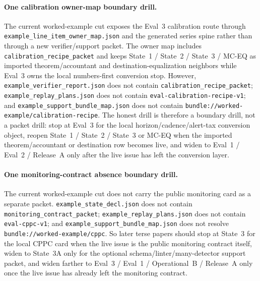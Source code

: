 \documentclass[11pt]{article}
\begin{document}
\paragraph{One calibration owner-map boundary drill.}
The current worked-example cut exposes the Eval~3 calibration route through \nolinkurl{example\_line\_item\_owner\_map.json} and the generated series spine rather than through a new verifier/support packet. The owner map includes \nolinkurl{calibration\_recipe\_packet} and keeps State~1 / State~2 / State~3 / MC-EQ as imported theorem/accountant and destination-equalization neighbors while Eval~3 owns the local numbers-first conversion stop. However, \nolinkurl{example\_verifier\_report.json} does not contain \nolinkurl{calibration\_recipe\_packet}; \nolinkurl{example\_replay\_plans.json} does not contain \nolinkurl{eval-calibration-recipe-v1}; and \nolinkurl{example\_support\_bundle\_map.json} does not contain \nolinkurl{bundle://worked-example/calibration-recipe}. The honest drill is therefore a boundary drill, not a packet drill: stop at Eval~3 for the local horizon/cadence/alert-tax conversion object, reopen State~1 / State~2 / State~3 or MC-EQ when the imported theorem/accountant or destination row becomes live, and widen to Eval~1 / Eval~2 / Release~A only after the live issue has left the conversion layer.\cite{state1,state2,state3,series:mceq,series:eval3,series:evalnotary,series:advantagecontracts,series:releaseproperty,series:workedexample,series:seriesspines}

\paragraph{One monitoring-contract absence boundary drill.}
The current worked-example cut does not carry the public monitoring card as a separate packet. \nolinkurl{example_state_decl.json} does not contain \nolinkurl{monitoring_contract_packet}; \nolinkurl{example_replay_plans.json} does not contain \nolinkurl{eval-cppc-v1}; and \nolinkurl{example_support_bundle_map.json} does not resolve \nolinkurl{bundle://worked-example/cppc}. So later terse papers should stop at State~3 for the local CPPC card when the live issue is the public monitoring contract itself, widen to State~3A only for the optional schema/linter/many-detector support packet, and widen farther to Eval~3 / Eval~1 / Operational~B / Release~A only once the live issue has already left the monitoring contract.\cite{series:state3,series:state3A,series:eval3,series:evalnotary,series:opB,series:release}
\end{document}
